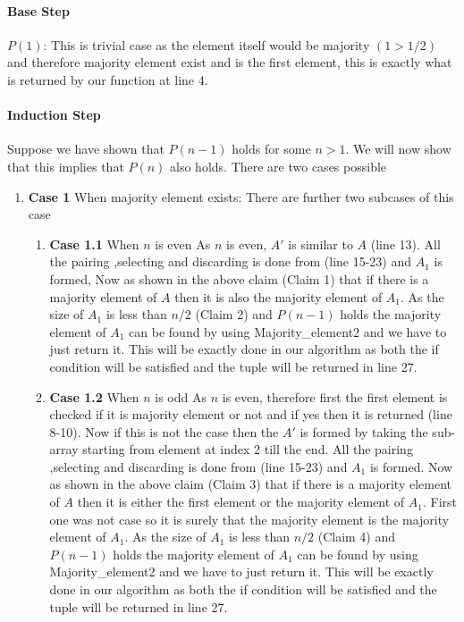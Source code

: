 \documentclass[answers]{exam}
\begin{document}
\begin{questions}
\begin{parts}
\begin{solution}
\paragraph{Base Step} $P(1)$: This is trivial case as the element itself would be majority $(1>1/2)$ and therefore majority element exist and is the first element, this is exactly what is returned by our function at line 4.

\paragraph{Induction Step} Suppose  we  have  shown  that $P(n-1)$  holds  for  some $n >1$. We  will  now show that this implies that $P(n)$ also holds. There are two cases possible
\begin{enumerate}
\item \textbf{Case 1} When majority element exists:
\newline There are further two subcases of this case
\begin{enumerate}
\item \textbf{Case 1.1} When $n$ is even
\newline As $n$ is even, $A'$ is similar to $A$ (line 13). All the pairing ,selecting and discarding is done from (line 15-23) and $A_{1}$ is formed, Now as shown in the above claim (Claim 1) that if there is a majority element of $A$ then it is also the majority element of $A_{1}$. As the size of $A_{1}$ is less than $n/2$ (Claim 2) and $P(n-1)$ holds the majority element of $A_{1}$ can be found by using Majority\_element2 and we have to just return it. This will be exactly done in our algorithm as both the if condition will be satisfied and the tuple will be returned in line 27.

\item \textbf{Case 1.2} When $n$ is odd
\newline As $n$ is even, therefore first the first element is checked if it is majority element or not and if yes then it is returned (line 8-10). Now if this is not the case then the $A'$ is formed by taking the sub-array starting from element at index 2 till the end. All the pairing ,selecting and discarding is done from (line 15-23) and $A_{1}$ is formed.
\newline Now as shown in the above claim (Claim 3) that if there is a majority element of $A$ then it is either the first element or the majority element of $A_{1}$. First one was not case so it is surely that the majority element is the majority element of $A_{1}$. As the size of $A_{1}$ is less than $n/2$ (Claim 4) and $P(n-1)$ holds the majority element of $A_{1}$ can be found by using Majority\_element2 and we have to just return it. This will be exactly done in our algorithm as both the if condition will be satisfied and the tuple will be returned in line 27.
\end{enumerate}


\end{enumerate}
\end{solution}
\end{parts}
\end{questions}
\end{document}
